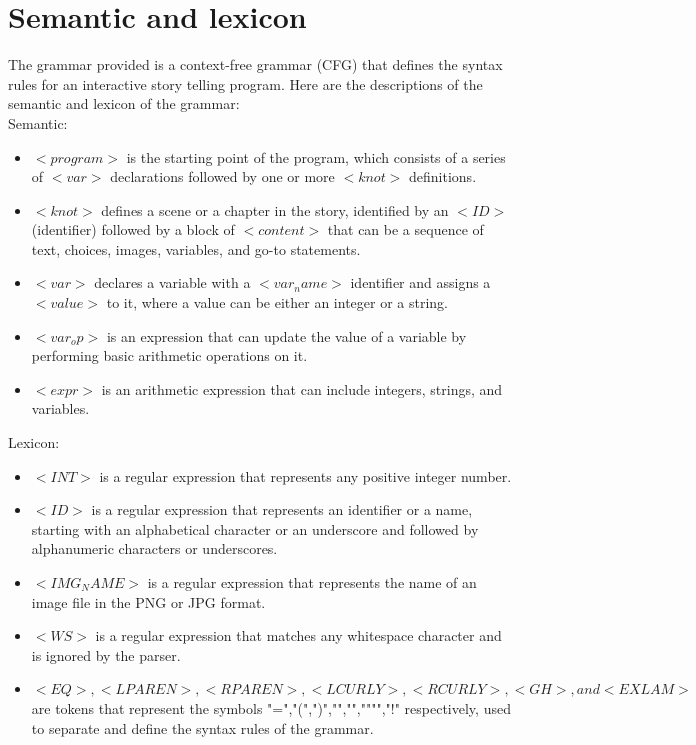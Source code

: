 \section{Semantic and lexicon}
\noindent The grammar provided is a context-free grammar (CFG) that defines the syntax rules for an interactive story telling program. Here are the descriptions of the semantic and lexicon of the grammar:\\
Semantic:
\begin{itemize}
        \item $<program>$ is the starting point of the program, which consists of a series of $<var>$ declarations followed by one or more $<knot>$ definitions.
        \item $<knot>$ defines a scene or a chapter in the story, identified by an $<ID>$ (identifier) followed by a block of $<content>$ that can be a sequence of text, choices, images, variables, and go-to statements.
        \item $<var>$ declares a variable with a $<var_name>$ identifier and assigns a $<value>$ to it, where a value can be either an integer or a string.
        \item $<var_op>$ is an expression that can update the value of a variable by performing basic arithmetic operations on it.
        \item $<expr>$ is an arithmetic expression that can include integers, strings, and variables. \\
\end{itemize}
Lexicon:
\begin{itemize}
        \item $<INT>$ is a regular expression that represents any positive integer number.
        \item $<ID>$ is a regular expression that represents an identifier or a name, starting with an alphabetical character or an underscore and followed by alphanumeric characters or underscores.
        \item $<IMG_NAME>$ is a regular expression that represents the name of an image file in the PNG or JPG format.
        \item $<WS>$ is a regular expression that matches any whitespace character and is ignored by the parser.
        \item $<EQ>, <LPAREN>, <RPAREN>, <LCURLY>, <RCURLY>, <GH>, and <EXLAM>$ are tokens that represent the symbols "=","(",")","{","}","""","!" respectively, used to separate and define the syntax rules of the grammar.
\end{itemize}

